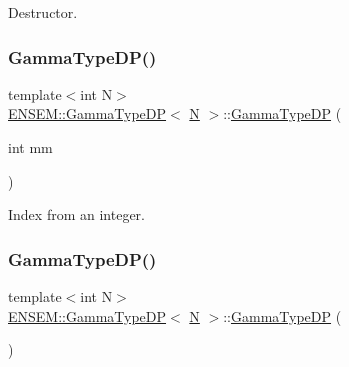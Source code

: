 Destructor. 

\mbox{\label{classENSEM_1_1GammaTypeDP_a6a31946a6e7bde24f7bae87f6cfd2add}} 
\subsubsection{\texorpdfstring{GammaTypeDP()}{GammaTypeDP()}\hspace{0.1cm}{\footnotesize\ttfamily [2/6]}}
{\footnotesize\ttfamily template$<$int N$>$ \\
\mbox{\hyperlink{classENSEM_1_1GammaTypeDP}{E\+N\+S\+E\+M\+::\+Gamma\+Type\+DP}}$<$ \mbox{\hyperlink{adat__devel_2lib_2hadron_2operator__name__util_8cc_a7722c8ecbb62d99aee7ce68b1752f337}{N}} $>$\+::\mbox{\hyperlink{classENSEM_1_1GammaTypeDP}{Gamma\+Type\+DP}} (\begin{DoxyParamCaption}\item[{int}]{mm }\end{DoxyParamCaption})\hspace{0.3cm}{\ttfamily [inline]}}



Index from an integer. 

\mbox{\label{classENSEM_1_1GammaTypeDP_a1833bb262c5e172a0463d853c76c1d18}} 
\subsubsection{\texorpdfstring{GammaTypeDP()}{GammaTypeDP()}\hspace{0.1cm}{\footnotesize\ttfamily [3/6]}}
{\footnotesize\ttfamily template$<$int N$>$ \\
\mbox{\hyperlink{classENSEM_1_1GammaTypeDP}{E\+N\+S\+E\+M\+::\+Gamma\+Type\+DP}}$<$ \mbox{\hyperlink{adat__devel_2lib_2hadron_2operator__name__util_8cc_a7722c8ecbb62d99aee7ce68b1752f337}{N}} $>$\+::\mbox{\hyperlink{classENSEM_1_1GammaTypeDP}{Gamma\+Type\+DP}} (\begin{DoxyParamCaption}{ }\end{DoxyParamCaption})\hspace{0.3cm}{\ttfamily [inline]}}



